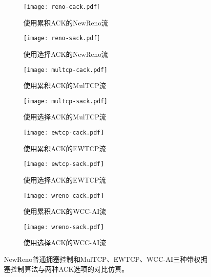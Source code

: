 \documentclass[winfonts]{njuthesis}
\begin{document}
\begin{figure}[ht!]
	\begin{subfigure}{.5\textwidth}
    \centering
		\texttt{[image: reno-cack.pdf]}
    \caption{使用累积ACK的NewReno流}
    \label{fig:renoCack}
  \end{subfigure}
	\begin{subfigure}{.5\textwidth}
    \centering
		\texttt{[image: reno-sack.pdf]}
    \caption{使用选择ACK的NewReno流}
    \label{fig:renoSack}
  \end{subfigure}
	\begin{subfigure}{.5\textwidth}
    \centering
		\texttt{[image: multcp-cack.pdf]}
    \caption{使用累积ACK的MulTCP流}
    \label{fig:multcpCack}
  \end{subfigure}
	\begin{subfigure}{.5\textwidth}
    \centering
		\texttt{[image: multcp-sack.pdf]}
    \caption{使用选择ACK的MulTCP流}
    \label{fig:multcpSack}
  \end{subfigure}
	\begin{subfigure}{.5\textwidth}
    \centering
		\texttt{[image: ewtcp-cack.pdf]}
    \caption{使用累积ACK的EWTCP流}
    \label{fig:ewtcpCack}
  \end{subfigure}
	\begin{subfigure}{.5\textwidth}
    \centering
		\texttt{[image: ewtcp-sack.pdf]}
    \caption{使用选择ACK的EWTCP流}
    \label{fig:ewtcpSack}
  \end{subfigure}
	\begin{subfigure}{.5\textwidth}
    \centering
		\texttt{[image: wreno-cack.pdf]}
    \caption{使用累积ACK的WCC-AI流}
    \label{fig:wrenoCack}
  \end{subfigure}
	\begin{subfigure}{.5\textwidth}
    \centering
		\texttt{[image: wreno-sack.pdf]}
    \caption{使用选择ACK的WCC-AI流}
    \label{fig:wrenoSack}
  \end{subfigure}
	\caption{NewReno普通拥塞控制和MulTCP、EWTCP、WCC-AI三种带权拥塞控制算法与两种ACK选项的对比仿真。}
	\label{fig:CackSackDiff}
\end{figure}
\end{document}
